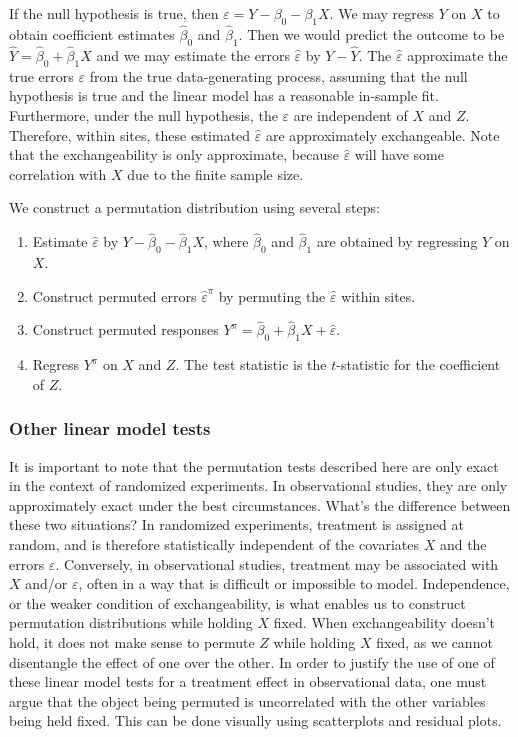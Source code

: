\documentclass[11pt]{article}
\newcommand{\todo}[1]{{\color{red}{TO DO: \sc #1}}}
\begin{document}
If the null hypothesis is true, then $\varepsilon = Y - \beta_0 - \beta_1X$.
We may regress $Y$ on $X$ to obtain coefficient estimates $\hat{\beta}_0$ and $\hat{\beta}_1$.
Then we would predict the outcome to be $\hat{Y} = \hat{\beta}_0 + \hat{\beta}_1X$
and we may estimate the errors $\hat{\varepsilon}$ by $Y - \hat{Y}$.
The $\hat{\varepsilon}$ approximate the true errors $\varepsilon$ from the true data-generating process, assuming that the null hypothesis is true and the linear model has a reasonable in-sample fit.
Furthermore, under the null hypothesis, the $\varepsilon$ are independent of $X$ and $Z$. \todo{ this is false. fix}
Therefore, within sites, these estimated $\hat{\varepsilon}$ are approximately exchangeable.
Note that the exchangeability is only approximate, because $\hat{\varepsilon}$ will have some correlation with $X$ due to the finite sample size. \todo{ fix wording}

We construct a permutation distribution using several steps:

\begin{enumerate}
\item Estimate $\hat{\varepsilon}$ by $Y - \hat{\beta}_0 - \hat{\beta}_1 X$, where $\hat{\beta}_0$ and $\hat{\beta}_1$ are obtained by regressing $Y$ on $X$.
\item Construct permuted errors $\hat{\varepsilon}^\pi$ by permuting the $\hat{\varepsilon}$ within sites.
\item Construct permuted responses $Y^\pi = \hat{\beta}_0 + \hat{\beta}_1 X + \hat{\varepsilon}$.
\item Regress $Y^\pi$ on $X$ and $Z$. The test statistic is the $t$-statistic for the coefficient of $Z$.
\end{enumerate}


\subsubsection{Other linear model tests}
It is important to note that the permutation tests described here are only exact in the context of randomized experiments.
In observational studies, they are only approximately exact under the best circumstances.
What's the difference between these two situations?
In randomized experiments, treatment is assigned at random, and is therefore statistically independent of the covariates $X$ and the errors $\varepsilon$.
Conversely, in observational studies, treatment may be associated with $X$ and/or $\varepsilon$, often in a way that is difficult or impossible to model.
Independence, or the weaker condition of exchangeability, is what enables us to construct permutation distributions while holding $X$ fixed.
When exchangeability doesn't hold, it does not make sense to permute $Z$ while holding $X$ fixed, as we cannot disentangle the effect of one over the other.
In order to justify the use of one of these linear model tests for a treatment effect in observational data, one must argue that the object being permuted is uncorrelated with the other variables being held fixed.
This can be done visually using scatterplots and residual plots.
\todo{citations!}
\end{document}
